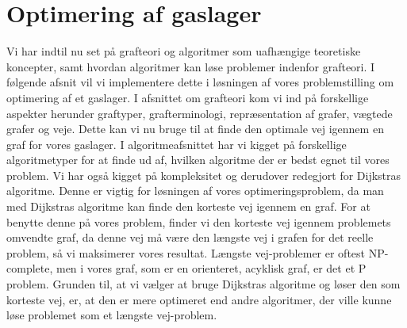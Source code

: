 \chapter{Optimering af gaslager}
Vi har indtil nu set på grafteori og algoritmer som  uafhængige teoretiske koncepter, samt hvordan algoritmer kan løse problemer indenfor grafteori. I følgende afsnit vil vi implementere dette i løsningen af vores problemstilling om optimering af et gaslager. I afsnittet om grafteori kom vi ind på forskellige aspekter herunder graftyper, grafterminologi, repræsentation af grafer, vægtede grafer og veje. Dette kan vi nu bruge til at finde den optimale vej igennem en graf for vores gaslager. I algoritmeafsnittet har vi kigget på forskellige algoritmetyper for at finde ud af, hvilken algoritme der er bedst egnet til vores problem. Vi har også kigget på kompleksitet og derudover redegjort for Dijkstras algoritme. Denne er vigtig for løsningen af vores optimeringsproblem, da man med Dijkstras algoritme kan finde den korteste vej igennem en graf. For at benytte denne på vores problem, finder vi den korteste vej igennem problemets omvendte graf, da denne vej må være den længste vej i grafen for det reelle problem, så vi maksimerer vores resultat. Længste vej-problemer er oftest NP-complete, men i vores graf, som er en orienteret, acyklisk graf, er det et P problem. Grunden til, at vi vælger at bruge Dijkstras algoritme og løser den som korteste vej, er, at den er mere optimeret end andre algoritmer, der ville kunne løse problemet som et længste vej-problem.



















